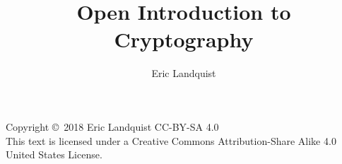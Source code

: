 \documentclass{book}
\newcommand{\<}{\left\langle}
\renewcommand{\>}{\right\rangle}
\theoremstyle{definition}
\begin{document}

\title{Open Introduction to Cryptography}
\author{Eric Landquist}
\maketitle


\thispagestyle{empty}
\noindent Copyright \copyright\ 2018 Eric Landquist CC-BY-SA 4.0\\ %

\noindent This text is licensed under a Creative Commons Attribution-Share Alike 4.0 United
States License.\\
\end{document}
